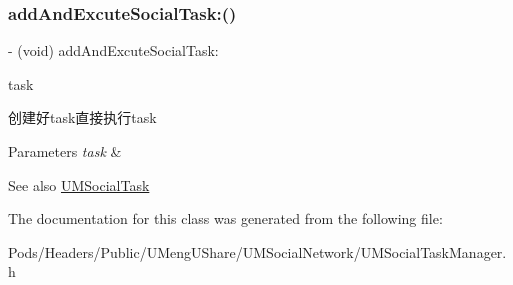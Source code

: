 \subsubsection{\texorpdfstring{add\+And\+Excute\+Social\+Task\+:()}{addAndExcuteSocialTask:()}\hspace{0.1cm}{\footnotesize\ttfamily [2/2]}}
{\footnotesize\ttfamily -\/ (void) add\+And\+Excute\+Social\+Task\+: \begin{DoxyParamCaption}\item[{(\mbox{\hyperlink{interface_u_m_social_task}{U\+M\+Social\+Task}} $\ast$)}]{task }\end{DoxyParamCaption}}

创建好task直接执行task


\begin{DoxyParams}{Parameters}
{\em task} & \\
\hline
\end{DoxyParams}
\begin{DoxySeeAlso}{See also}
\mbox{\hyperlink{interface_u_m_social_task}{U\+M\+Social\+Task}} 
\end{DoxySeeAlso}


The documentation for this class was generated from the following file\+:\begin{DoxyCompactItemize}
\item 
Pods/\+Headers/\+Public/\+U\+Meng\+U\+Share/\+U\+M\+Social\+Network/U\+M\+Social\+Task\+Manager.\+h\end{DoxyCompactItemize}

